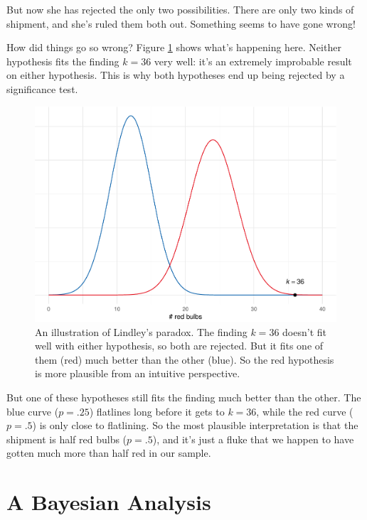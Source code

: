 \documentclass[justified]{tufte-book}
\theoremstyle{definition}
\theoremstyle{definition}
\theoremstyle{definition}
\theoremstyle{remark}
\begin{document}
But now she has rejected the only two possibilities. There are only two kinds of shipment, and she's ruled them both out. Something seems to have gone wrong!

How did things go so wrong? Figure \ref{fig:lindley} shows what's happening here. Neither hypothesis fits the finding \(k = 36\) very well: it's an extremely improbable result on either hypothesis. This is why both hypotheses end up being rejected by a significance test.

\begin{figure}
\includegraphics{_main_files/figure-latex/lindley-1} \caption[An illustration of Lindley's paradox]{An illustration of Lindley's paradox. The finding $k = 36$ doesn't fit well with either hypothesis, so both are rejected. But it fits one of them (red) much better than the other (blue). So the red hypothesis is more plausible from an intuitive perspective.}\label{fig:lindley}
\end{figure}

But one of these hypotheses still fits the finding much better than the other. The blue curve (\(p = .25\)) flatlines long before it gets to \(k = 36\), while the red curve (\(p = .5\)) is only close to flatlining. So the most plausible interpretation is that the shipment is half red bulbs (\(p = .5\)), and it's just a fluke that we happen to have gotten much more than half red in our sample.

\hypertarget{a-bayesian-analysis}{%
\section{A Bayesian Analysis}\label{a-bayesian-analysis}}
\end{document}
